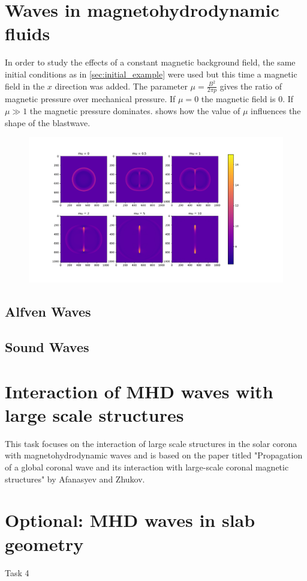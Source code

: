 \documentclass[11pt]{article}
\begin{document}
\section{Waves in magnetohydrodynamic fluids} \label{sec:waves_in_magnetorhydrodynamic_fluids}
In order to study the effects of a constant magnetic background field, the same initial conditions as in \cref{sec:initial_example} were used but this time a magnetic field in the $x$ direction was added.
The parameter $\mu = \frac{B^2}{2\pi p}$ gives the ratio of magnetic pressure over mechanical pressure. If $\mu = 0$ the magnetic field is $0$. If $\mu \gg 1$ the magnetic pressure dominates.  shows how the value of $\mu$ influences the shape of the blastwave.
\begin{figure}[h]
	\centering
	\includegraphics[width = \linewidth]{figures/influence_mu.pdf}
	\caption{}
\label{fig:blastwave_shape_mu}
\end{figure}
\subsection{Alfv\´en Waves}
\subsection{Sound Waves}
\section{Interaction of MHD waves with large scale structures}
This task focuses on the interaction of large scale structures in the solar corona with magnetohydrodynamic waves and is based on the paper titled "Propagation of a global coronal wave and its interaction with large-scale coronal magnetic structures" by Afanasyev and Zhukov. 
\section{Optional: MHD waves in slab geometry}
Task 4
\printbibliography
\end{document}
